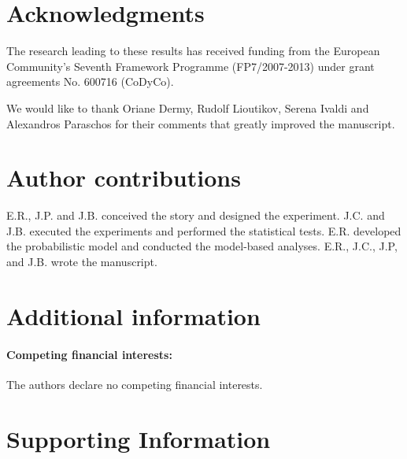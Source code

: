 \section*{Acknowledgments}
The research leading to these results has received funding from the European
Community's Seventh Framework Programme (FP7/2007-2013) under grant agreements No. 600716 (CoDyCo). 

We would like to thank Oriane Dermy, Rudolf Lioutikov, Serena Ivaldi and Alexandros Paraschos for their comments 
that greatly improved the manuscript. 

\section*{Author contributions}
E.R., J.P. and J.B. conceived the story and designed the experiment. 
J.C. and J.B. executed the experiments and performed the statistical tests. 
E.R. developed the probabilistic model and conducted the model-based analyses. 
E.R., J.C., J.P, and J.B. wrote the manuscript.

\section*{Additional information}

\paragraph{Competing financial interests:} The authors declare no competing financial interests.

\newpage

\renewcommand{\thesection}{S\arabic{section}}  
\renewcommand{\thetable}{S\arabic{table}}  
\renewcommand{\thefigure}{S\arabic{figure}} 
\renewcommand{\theequation}{S\arabic{equation}} 

\section*{Supporting Information}

